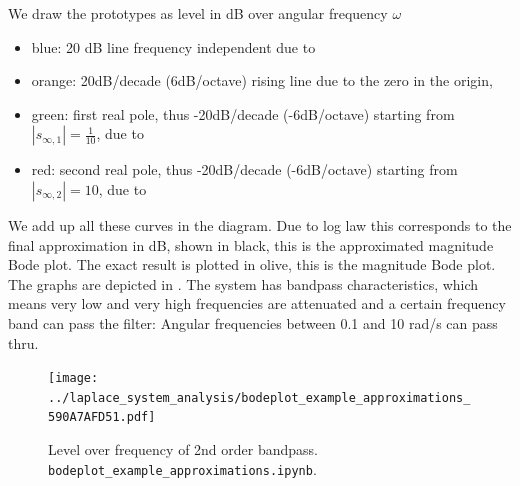\begin{Loesung}

We draw the prototypes as level in dB over angular frequency $\omega$
\begin{itemize}
\item blue: 20 dB line frequency independent due to 
\item orange: 20dB/decade (6dB/octave) rising line due to the zero in the origin,
\item green: first real pole, thus -20dB/decade (-6dB/octave) starting from $|s_{\infty,1}| = \frac{1}{10}$, due to
\item red: second real pole, thus -20dB/decade (-6dB/octave) starting from $|s_{\infty,2}| = 10$, due to
\end{itemize}
We add up all these curves in the diagram. Due to log law this corresponds to the final approximation
in dB, shown in black, this is the approximated magnitude Bode plot.
The exact result is plotted in olive, this is the magnitude Bode plot.
The graphs are depicted in .
The system has bandpass characteristics, which means very low and very high
frequencies are attenuated and a certain frequency band can pass the filter:
Angular frequencies between 0.1 and 10 rad/s can pass
thru.
\end{Loesung}

\begin{figure}[h!]
\centering
\texttt{[image: ../laplace\_system\_analysis/bodeplot\_example\_approximations\_590A7AFD51.pdf]}
\caption{Level over frequency of 2nd order bandpass.
\texttt{bodeplot\_example\_approximations.ipynb}.}
\label{fig:bodeplot_example_approximations_590A7AFD51}
\end{figure}
















\clearpage
